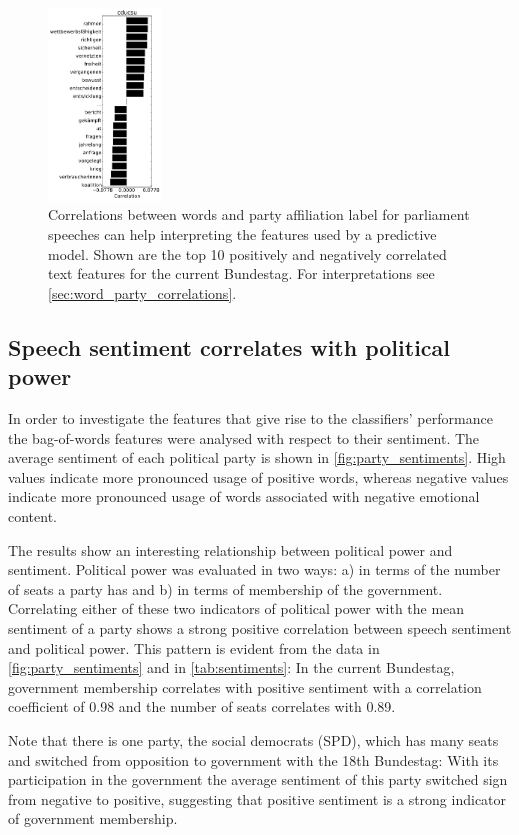 \documentclass{article}
\begin{document}
\begin{figure}
\begin{center}
\includegraphics[width=3cm]{images/party_word_correlations-cducsu-18.pdf}
%
\end{center}
\caption{
\label{fig:party_word_correlations}
Correlations between words and party affiliation label for parliament speeches can help interpreting the features used by a predictive model. Shown are the top 10 positively and negatively correlated text features for the current Bundestag. For interpretations see \autoref{sec:word_party_correlations}.}
\end{figure}


\subsection{Speech sentiment correlates with political power}\label{sec:sentiment_result}
In order to investigate the features that give rise to the classifiers' performance the bag-of-words features were analysed with respect to their sentiment. The average sentiment of each political party is shown in \autoref{fig:party_sentiments}. High values indicate more pronounced usage of positive words, whereas negative values indicate more pronounced usage of words associated with negative emotional content. 

The results show an interesting relationship between political power and sentiment. Political power was evaluated in two ways: a) in terms of the number of seats a party has and b) in terms of membership of the government. Correlating either of these two indicators of political power with the mean sentiment of a party shows a strong positive correlation between speech sentiment and political power. This pattern is evident from the data in \autoref{fig:party_sentiments} and in \autoref{tab:sentiments}: In the current Bundestag, government membership correlates with positive sentiment with a correlation coefficient of 0.98 and the number of seats correlates with 0.89. 

Note that there is one party, the social democrats (SPD), which has many seats and switched from opposition to government with the 18th Bundestag: With its participation in the government the average sentiment of this party switched sign from negative to positive, suggesting that positive sentiment is a strong indicator of government membership. 
\end{document}
